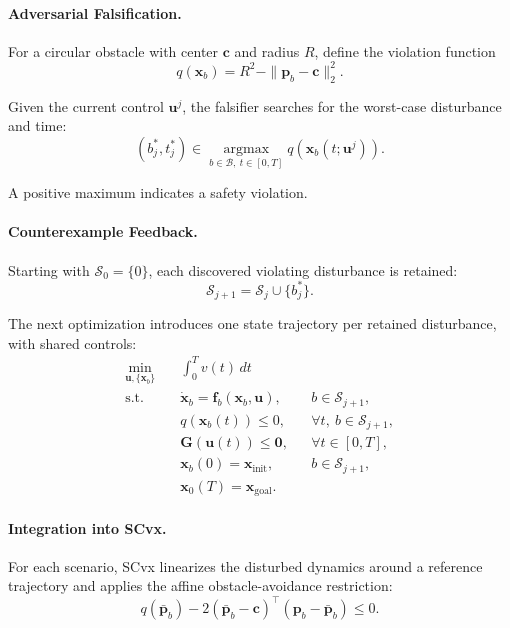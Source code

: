 \documentclass{article}
\begin{document}
\paragraph{Adversarial Falsification.}
For a circular obstacle with center $\bm c$ and
radius $R$, define the violation function
\begin{equation}
q(\bm{x}_b)=R^2-\|\bm p_b-\bm c\|_2^2.
\end{equation}

Given the current control $\bm u^j$, the falsifier
searches for the worst-case disturbance and time:
\begin{equation}
\boxed{
(b_j^*,t_j^*)\in
\underset{b\in\mathcal B,\ t\in[0,T]}
{\operatorname{argmax}}
q(\bm{x}_b(t;\bm u^j)).
}
\end{equation}

A positive maximum indicates a safety violation.

\paragraph{Counterexample Feedback.}
Starting with $\mathcal S_0=\{0\}$, each discovered
violating disturbance is retained:
\begin{equation}
\boxed{
\mathcal S_{j+1}=\mathcal S_j\cup\{b_j^*\}.
}
\end{equation}

The next optimization introduces one state trajectory
per retained disturbance, with shared controls:
\begin{equation}
\begin{aligned}
\min_{\bm u,\{\bm{x}_b\}}\quad
&\int_0^T v(t)\,dt\\
\mathrm{s.t.}\quad
&\dot{\bm{x}}_b=\bm f_b(\bm{x}_b,\bm u),
&&b\in\mathcal S_{j+1},\\
&q(\bm{x}_b(t))\leq0,
&&\forall t,\ b\in\mathcal S_{j+1},\\
&\bm G(\bm u(t))\leq\bm0,
&&\forall t\in[0,T],\\
&\bm{x}_b(0)=\bm{x}_{\mathrm{init}},
&&b\in\mathcal S_{j+1},\\
&\bm{x}_0(T)=\bm{x}_{\mathrm{goal}}.
\end{aligned}
\end{equation}

\paragraph{Integration into SCvx.}
For each scenario, SCvx linearizes the disturbed
dynamics around a reference trajectory and applies
the affine obstacle-avoidance restriction:
\begin{equation}
\boxed{
q(\bar{\bm p}_b)
-2(\bar{\bm p}_b-\bm c)^\top
(\bm p_b-\bar{\bm p}_b)\leq0.
}
\end{equation}
\end{document}
